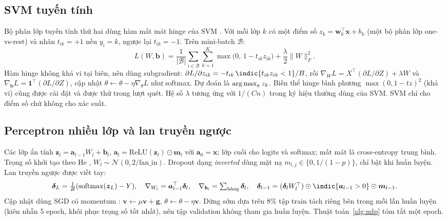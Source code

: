 \subsection{SVM tuyến tính}
\label{sec:svm}
Bộ phân lớp tuyến tính thứ hai dùng hàm mất mát hinge của SVM \citep{bishop2006}. Với mỗi lớp $k$ có một điểm số $z_k=\bm w_k^{\top}\bm x+b_k$ (một bộ phân lớp one-vs-rest) và nhãn $t_{ik}=+1$ nếu $y_i=k$, ngược lại $t_{ik}=-1$. Trên mini-batch $\mathcal B$:
\begin{equation}
L(W,\bm b)=\frac1{|\mathcal B|}\sum_{i\in\mathcal B}\sum_{k=1}^{K}\max\big(0,\,1-t_{ik}z_{ik}\big)+\frac{\lambda}{2}\lVert W\rVert_F^2 .
\label{eq:svm}
\end{equation}
Hàm hinge không khả vi tại biên, nên dùng subgradient: $\partial L/\partial z_{ik}=-t_{ik}\,\indic{t_{ik}z_{ik}<1}/B$, rồi $\nabla_W L=X^{\top}(\partial L/\partial Z)+\lambda W$ và $\nabla_{\bm b}L=\bm 1^{\top}(\partial L/\partial Z)$, cập nhật $\theta\leftarrow\theta-\eta\nabla_\theta L$ như softmax. Dự đoán là $\operatorname*{arg\,max}_k z_k$. Biến thể hinge bình phương $\max(0,1-tz)^2$ (khả vi) cũng được cài đặt và được thử trong lượt quét. Hệ số $\lambda$ tương ứng với $1/(Cn)$ trong ký hiệu thường dùng của SVM. SVM chỉ cho điểm số chứ không cho xác suất.

\subsection{Perceptron nhiều lớp và lan truyền ngược}
Các lớp ẩn tính $\bm z_l=\bm a_{l-1}W_l+\bm b_l$, $\bm a_l=\mathrm{ReLU}(\bm z_l)\odot\bm m_l$ với $\bm a_0=\bm x$; lớp cuối cho logits và softmax; mất mát là cross-entropy trung bình. Trọng số khởi tạo theo He \citep{he2015}, $W_l\sim\mathcal N(0,2/\mathrm{fan\_in})$. Dropout dạng \emph{inverted} \citep{srivastava2014} dùng mặt nạ $m_{l,j}\in\{0,1/(1-p)\}$, chỉ bật khi huấn luyện. Lan truyền ngược \citep{rumelhart1986} được viết tay:
\begin{equation}
\bm\delta_L=\tfrac1B(\mathrm{softmax}(\bm z_L)-Y),\quad
\nabla_{W_l}=\bm a_{l-1}^{\top}\bm\delta_l,\quad
\nabla_{\bm b_l}=\textstyle\sum_{\text{hàng}}\bm\delta_l,\quad
\bm\delta_{l-1}=(\bm\delta_l W_l^{\top})\odot\indic{\bm a_{l-1}>0}\odot\bm m_{l-1}.
\label{eq:backprop}
\end{equation}
Cập nhật dùng SGD có momentum \citep{sutskever2013}: $\bm v\leftarrow\mu\bm v+\bm g$, $\theta\leftarrow\theta-\eta\bm v$. Dừng sớm \citep{prechelt1998} dựa trên $8\%$ tập train tách riêng bên trong mỗi lần huấn luyện (kiên nhẫn 5 epoch, khôi phục trọng số tốt nhất), nên tập validation không tham gia huấn luyện. Thuật toán~\ref{alg:mlp} tóm tắt một epoch.


